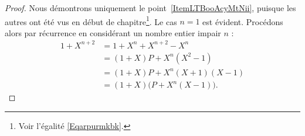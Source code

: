 \begin{proof}
  Nous démontrons uniquement le point~\ref{ItemLTBooAcyMtNii}, puisque
  les autres ont été vus en début de chapitre\footnote{Voir l'égalité
    \eqref{Eqarpurmkbk}.}. Le cas \( n=1\) est évident. Procédons
  alors par récurrence en considérant un nombre entier impair \( n\) :
    \begin{subequations}
        \begin{align}
            1+X^{n+2}&=1+X^n+X^{n+2}-X^n\\
                    &=(1+X)P+X^n(X^2-1)\\
                    &=(1+X)P+X^n(X+1)(X-1)\\
                    &=(1+X)\big( P+X^n(X-1) \big).
        \end{align}
    \end{subequations}
\end{proof}
